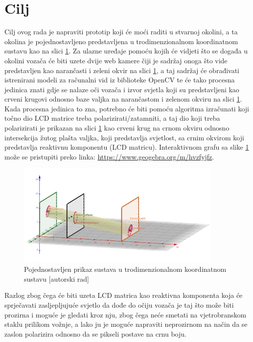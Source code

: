 \documentclass{foi}
\begin{document}
\section{Cilj}

Cilj ovog rada je napraviti prototip koji će moći raditi u stvarnoj okolini, a ta okolina je pojednostavljeno predstavljena u trodimenzionalnom koordinatnom sustavu kao na slici \ref{fig:prikaz_sustava_1}. Za ulazne uređaje pomoću kojih će vidjeti što se događa u okolini vozača će biti uzete dvije web kamere čiji je sadržaj onoga što vide predstavljen kao narančasti i zeleni okvir na slici \ref{fig:prikaz_sustava_1}, a taj sadržaj će obrađivati istrenirani modeli za računalni vid iz biblioteke OpenCV te će tako procesna jedinica znati gdje se nalaze oči vozača i izvor svjetla koji su predstavljeni kao crveni krugovi odnosno baze valjka na narančastom i zelenom okviru na slici \ref{fig:prikaz_sustava_1}. Kada procesna jedinica to zna, potrebno će biti pomoću algoritma izračunati koji točno dio LCD matrice treba polarizirati/zatamniti, a taj dio koji treba polarizirati je prikazan na slici \ref{fig:prikaz_sustava_1} kao crveni krug na crnom okviru odnosno intersekcija žutog plašta valjka, koji predstavlja svjetlost, sa crnim okvirom koji predstavlja reaktivnu komponentu (LCD matricu). Interaktivnom grafu sa slike \ref{fig:prikaz_sustava_1} može se pristupiti preko linka: \url{https://www.geogebra.org/m/hvzfyjfz}.

\begin{figure}[h!]
    \centering
    \includegraphics[width=0.9\textwidth]{slike/graf_uvod}
    \caption{Pojednostavljen prikaz sustava u trodimenzionalnom koordinatnom sustavu [autorski rad]}
    \label{fig:prikaz_sustava_1}
\end{figure}

Razlog zbog čega će biti uzeta LCD matrica kao reaktivna komponenta koja će sprječavati zasljepljujuće svjetlo da dođe do očiju vozača je taj što može biti prozirna i moguće je gledati kroz nju, zbog čega neće smetati na vjetrobranskom staklu prilikom vožnje, a lako ju je moguće napraviti neprozirnom na način da se zaslon polarizira odnosno da se pikseli postave na crnu boju.
\end{document}
